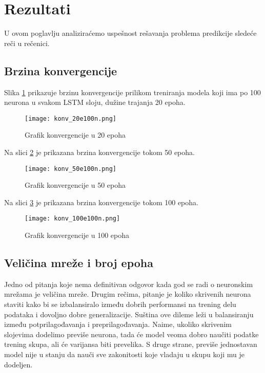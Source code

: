 \documentclass[a4paper]{article}
\begin{document}
\section{Rezultati}

U ovom poglavlju analiziraćemo uspešnost rešavanja problema predikcije sledeće reči u rečenici. 

\subsection{Brzina konvergencije}

Slika \ref{fig:konv_20} prikazuje brzinu konvergencije prilikom treniranja modela koji ima po 100 neurona u svakom LSTM sloju, dužine trajanja 20 epoha.

\begin{figure}[htp]
    \centering
    \texttt{[image: konv\_20e100n.png]}
    \caption{Grafik konvergencije u 20 epoha}
    \label{fig:konv_20}
\end{figure}

Na slici \ref{fig:konv_50} je prikazana brzina konvergencije tokom 50 epoha.

\begin{figure}[htp]
    \centering
    \texttt{[image: konv\_50e100n.png]}
    \caption{Grafik konvergencije u 50 epoha}
    \label{fig:konv_50}
\end{figure}


Na slici \ref{fig:konv_100} je prikazana brzina konvergencije tokom 100 epoha.

\begin{figure}[htp]
    \centering
    \texttt{[image: konv\_100e100n.png]}
    \caption{Grafik konvergencije u 100 epoha}
    \label{fig:konv_100}
\end{figure}


\subsection{Veličina mreže i broj epoha}

Jedno od pitanja koje nema definitivan odgovor kada god se radi o neuronskim mrežama je veličina mreže. Drugim rečima, pitanje je koliko skrivenih neurona staviti kako bi se izbalansiralo između dobrih performansi na trening delu podataka i dovoljno dobre generalizacije. Suština ove dileme leži u balansiranju između potprilagođavanja i preprilagođavanja. Naime, ukoliko skrivenim slojevima dodelimo previše neurona, tada će model veoma dobro naučiti podatke trening skupa, ali će varijansa biti prevelika. S druge strane, previše jednostavan model nije u stanju da nauči sve zakonitosti koje vladaju u skupu koji mu je dodeljen.
\end{document}
